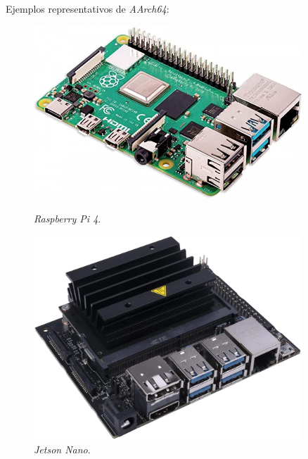 Ejemplos representativos de \textit{AArch64}:\\
\begin{figure} [h!]
	\begin{center}
		\begin{minipage}{0.45\textwidth}
			\begin{center}
				\includegraphics[width=0.9\textwidth]{figs/raspberrypi}
			\end{center}
			\caption{\textit{Raspberry Pi 4}.}
		\end{minipage}\hfill
		\begin{minipage}{0.45\textwidth}
			\begin{center}
				\includegraphics[width=0.9\textwidth]{figs/jetsonnano}
			\end{center}
			\caption{\textit{Jetson Nano}.}
		\end{minipage}
	\end{center}
	\label{fig:aarch64}
\end{figure}\

